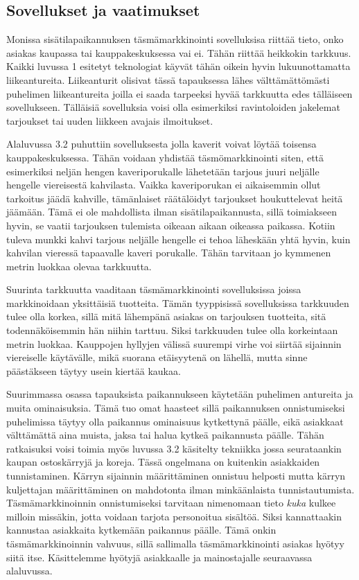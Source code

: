 \subsection{Sovellukset ja vaatimukset}
Monissa sisätilapaikannuksen täsmämarkkinointi sovelluksisa riittää tieto, onko asiakas kaupassa tai kauppakeskuksessa vai ei. Tähän riittää heikkokin tarkkuus. Kaikki luvussa 1 esitetyt teknologiat käyvät tähän oikein hyvin lukuunottamatta liikeantureita. Liikeanturit olisivat tässä tapauksessa lähes välttämättömästi puhelimen liikeantureita joilla ei saada tarpeeksi hyvää tarkkuutta edes tälläiseen sovellukseen. Tälläisiä sovelluksia voisi olla esimerkiksi ravintoloiden jakelemat tarjoukset tai uuden liikkeen avajais ilmoitukset.

Alaluvussa 3.2 puhuttiin sovelluksesta jolla kaverit voivat löytää toisensa kauppakeskuksessa. Tähän voidaan yhdistää täsmömarkkinointi siten, että esimerkiksi neljän hengen kaveriporukalle lähetetään tarjous juuri neljälle hengelle viereisestä kahvilasta. Vaikka kaveriporukan ei aikaisemmin ollut tarkoitus jäädä kahville, tämänlaiset räätälöidyt tarjoukset houkuttelevat heitä jäämään. Tämä ei ole mahdollista ilman sisätilapaikannusta, sillä toimiakseen hyvin, se vaatii tarjouksen tulemista oikeaan aikaan oikeassa paikassa. Kotiin tuleva munkki kahvi tarjous neljälle hengelle ei tehoa läheskään yhtä hyvin, kuin kahvilan vieressä tapaavalle kaveri porukalle. Tähän tarvitaan jo kymmenen metrin luokkaa olevaa tarkkuutta.

Suurinta tarkkuutta vaaditaan täsmämarkkinointi sovelluksissa joissa markkinoidaan yksittäisiä tuotteita. Tämän tyyppisissä sovelluksissa tarkkuuden tulee olla korkea, sillä mitä lähempänä asiakas on tarjouksen tuotteita, sitä todennäköisemmin hän niihin tarttuu. Siksi tarkkuuden tulee olla korkeintaan metrin luokkaa. Kauppojen hyllyjen välissä suurempi virhe voi siirtää sijainnin viereiselle käytävälle, mikä suorana etäisyytenä on lähellä, mutta sinne päästäkseen täytyy usein kiertää kaukaa.

Suurimmassa osassa tapauksista paikannukseen käytetään puhelimen antureita ja muita ominaisuksia. Tämä tuo omat haasteet sillä paikannuksen onnistumiseksi puhelimissa täytyy olla paikannus ominaisuus kytkettynä päälle, eikä asiakkaat välttämättä aina muista, jaksa tai halua kytkeä paikannusta päälle. Tähän ratkaisuksi voisi toimia myös luvussa 3.2 käsitelty tekniikka jossa seurataankin kaupan ostoskärryjä ja koreja. Tässä ongelmana on kuitenkin asiakkaiden tunnistaminen. Kärryn sijainnin määrittäminen onnistuu helposti mutta kärryn kuljettajan määrittäminen on mahdotonta ilman minkäänlaista tunnistautumista. Täsmämarkkinoinnin onnistumiseksi tarvitaan nimenomaan tieto \textit{kuka} kulkee milloin missäkin, jotta voidaan tarjota personoitua sisältöä. Siksi kannattaakin kannustaa asiakkaita kytkemään paikannus päälle. Tämä onkin täsmämarkkinoinnin vahvuus, sillä sallimalla täsmämarkkinointi asiakas hyötyy siitä itse. Käsittelemme hyötyjä asiakkaalle ja mainostajalle seuraavassa alaluvussa.


